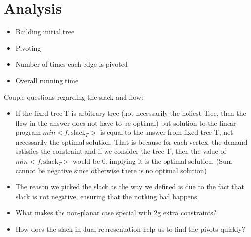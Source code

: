 \documentclass{article}
\begin{document}
\section{Analysis}
\begin{itemize}
\item Building initial tree
\item Pivoting
\item Number of times each edge is pivoted
\item Overall running time
\end{itemize}

Couple questions regarding the slack and flow:
\begin{itemize}
\item If the fixed tree T is arbitrary tree (not necessarily the holiest Tree, 
then the flow in the answer does not have to be optimal) but solution to the 
linear program $min <f, \text{slack}_T>$ is equal to the answer from fixed tree T, 
not necessarily the optimal solution. That is because for each vertex, the 
demand satisfies the constraint and if we consider the tree T, then the value of 
$min <f, \text{slack}_T>$ would be 0, implying it is the optimal solution. 
(Sum cannot be negative since otherwise there is no optimal solution)
\item The reason we picked the slack as the way we defined is due to the fact 
that slack is not negative, ensuring that the nothing bad happens.
\item What makes the non-planar case special with 2g extra constraints?
\item How does the slack in dual representation help us to find the pivots quickly?
\end{itemize}
\end{document}
